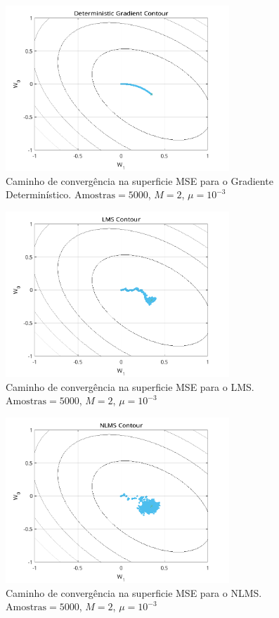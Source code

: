 \documentclass[a4paper,10pt]{article}
\begin{document}
\begin{enumerate}
				\begin{figure}[!ht]
					\centering
					\includegraphics[width=0.75\textwidth]{figs/gradient_contour.png}
					\caption{Caminho de convergência na superficie MSE para o Gradiente Determinístico. $\text{Amostras} = 5000$, $M = 2$, $\mu = 10^{-3}$}
					\label{fig:gradient_contour}
				\end{figure}

				\begin{figure}[!ht]
					\centering
					\includegraphics[width=0.75\textwidth]{figs/lms_contour.png}
					\caption{Caminho de convergência na superficie MSE para o LMS. $\text{Amostras} = 5000$, $M = 2$, $\mu = 10^{-3}$}
					\label{fig:lms_contour}
				\end{figure}

				\begin{figure}[!ht]
					\centering
					\includegraphics[width=0.75\textwidth]{figs/nlms_contour.png}
					\caption{Caminho de convergência na superficie MSE para o NLMS. $\text{Amostras} = 5000$, $M = 2$, $\mu = 10^{-3}$}
					\label{fig:nlms_contour}
				\end{figure}


\end{enumerate}
\end{document}
